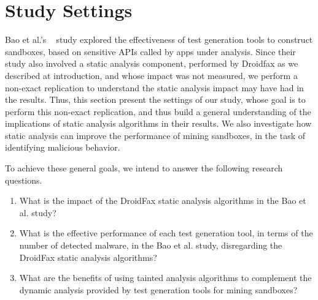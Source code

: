 \section{Study Settings}


Bao et al.'s ~\cite{DBLP:conf/wcre/BaoLL18} study explored the effectiveness of test generation tools to construct sandboxes, based on sensitive APIs called by apps under analysis. Since their study also involved a static analysis component, performed by Droidfax as we described at introduction, and whose impact was not measured, we perform a non-exact replication to understand the static analysis impact may have had in the results. Thus, this section present the settings of our study, whose goal is to perform this non-exact replication, and thus build a general understanding of the implications of static analysis algorithms in their results. We also investigate how static analysis can improve the performance of mining sandboxes, in the task of identifying malicious behavior.

To achieve these general goals, we intend to answer the following research questions.

\begin{enumerate}[(RQ1)]
 
 \item What is the impact of the DroidFax static analysis algorithms in the Bao et al. study?
  
 \item What is the effective performance of each test generation tool, in terms of the number of detected malware, in the Bao et al. study, disregarding the DroidFax
  static analysis algorithms?

 \item What are the benefits of using tainted analysis algorithms to complement the dynamic analysis provided by test generation tools for mining sandboxes?
\end{enumerate}


